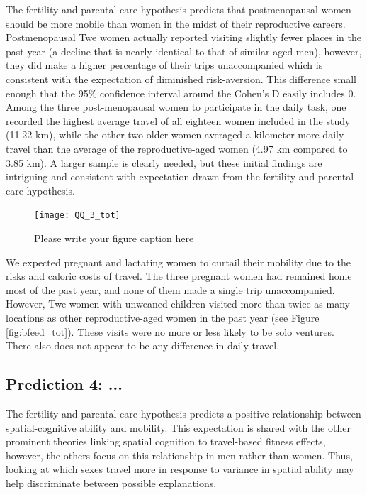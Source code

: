 The fertility and parental care hypothesis predicts that postmenopausal women should be more mobile than women in the midst of their reproductive careers.  Postmenopausal Twe women actually reported visiting slightly fewer places in the past year (a decline that is nearly identical to that of similar-aged men), however, they did make a higher percentage of their trips unaccompanied which is consistent with the expectation of diminished risk-aversion.  This difference small enough that the 95\% confidence interval around the Cohen's D easily includes 0.  Among the three post-menopausal women to participate in the daily task, one recorded the highest average travel of all eighteen women included in the study (11.22 km), while the other two older women averaged a kilometer more daily travel than the average of the reproductive-aged women (4.97 km compared to 3.85 km).  A larger sample is clearly needed, but these initial findings are intriguing and consistent with expectation drawn from the fertility and parental care hypothesis.

\begin{figure}[!htb]
  \texttt{[image: QQ\_3\_tot]}
\caption{Please write your figure caption here}
\label{fig:1}       %
\end{figure}


We expected pregnant and lactating women to curtail their mobility due to the risks and caloric costs of travel.  The three pregnant women had remained home most of the past year, and none of them made a single trip unaccompanied.  However, Twe women with unweaned children visited more than twice as many locations as other reproductive-aged women in the past year (see Figure \ref{fig:bfeed_tot}).  These visits were no more or less likely to be solo ventures.  There also does not appear to be any difference in daily travel. 		

	\subsection{Prediction 4: ... }
	\label{sec:3.1}
The fertility and parental care hypothesis predicts a positive relationship between spatial-cognitive ability and mobility. This expectation is shared with the other prominent theories linking spatial cognition to travel-based fitness effects, however, the others focus on this relationship in men rather than women.  Thus, looking at which sexes travel more in response to variance in spatial ability may help discriminate between possible explanations.	

